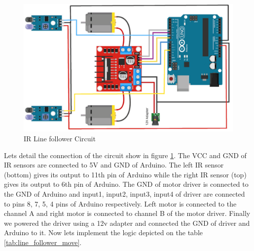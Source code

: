 \renewcommand{\arraystretch}{1}

\begin{figure}
    \centering
    \includegraphics{Images/IR Sensor/ir_bot.png}
     \caption{\ac{IR} Line follower Circuit}
     \label{fig:ir_bot}
\end{figure}

\par Lets detail the connection of the circuit show in figure \ref{fig:ir_bot}. The VCC and GND of \ac{IR} sensors are connected to 5V and GND of Arduino. The left \ac{IR} sensor (bottom) gives its output to 11th pin of Arduino while the right \ac{IR} sensor (top) gives its output to 6th pin of Arduino. The GND of motor driver is connected to the GND of Arduino and input1, input2, input3, input4 of driver are connected to pins 8, 7, 5, 4 pins of Arduino respectively. Left motor is connected to the channel A and right motor is connected to channel B of the motor driver. Finally we powered the driver using a 12v adapter and connected the GND of driver and Arduino to it. Now lets implement the logic depicted on the table \ref{tab:line_follower_move}.

